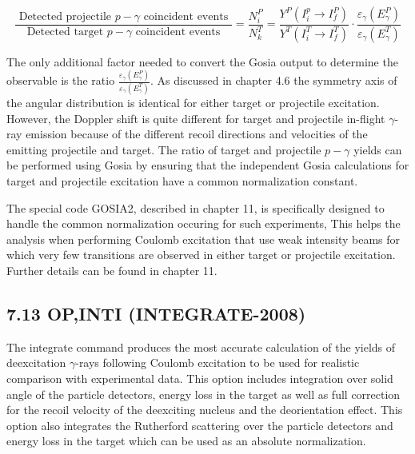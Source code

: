 \documentclass[10pt]{article}
\begin{document}
\begin{equation*}
\frac{\text { Detected projectile } p-\gamma \text { coincident events }}{\text { Detected target } p-\gamma \text { coincident events }}=\frac{N_{i}^{P}}{N_{k}^{T}}=\frac{Y^{P}\left(I_{i}^{p} \rightarrow I_{f}^{P}\right)}{Y^{T}\left(I_{i}^{T} \rightarrow I_{f}^{T}\right)} \cdot \frac{\varepsilon_{\gamma}\left(E_{\gamma}^{P}\right)}{\varepsilon_{\gamma}\left(E_{\gamma}^{T}\right)} \tag{7.2}
\end{equation*}


The only additional factor needed to convert the Gosia output to determine the observable is the ratio $\frac{\varepsilon_{\gamma}\left(E_{\gamma}^{P}\right)}{\varepsilon_{\gamma}\left(E_{\gamma}^{T}\right)}$. As discussed in chapter 4.6 the symmetry axis of the angular distribution is identical for either target or projectile excitation. However, the Doppler shift is quite different for target and projectile in-flight $\gamma$-ray emission because of the different recoil directions and velocities of the emitting projectile and target. The ratio of target and projectile $p-\gamma$ yields can be performed using Gosia by ensuring that the independent Gosia calculations for target and projectile excitation have a common normalization constant.

The special code GOSIA2, described in chapter 11, is specifically designed to handle the common normalization occuring for such experiments, This helps the analysis when performing Coulomb excitation that use weak intensity beams for which very few transitions are observed in either target or projectile excitation. Further details can be found in chapter 11.

\subsection*{7.13 OP,INTI (INTEGRATE-2008)}
The integrate command produces the most accurate calculation of the yields of deexcitation $\gamma$-rays following Coulomb excitation to be used for realistic comparison with experimental data. This option includes integration over solid angle of the particle detectors, energy loss in the target as well as full correction for the recoil velocity of the deexciting nucleus and the deorientation effect. This option also integrates the Rutherford scattering over the particle detectors and energy loss in the target which can be used as an absolute normalization.
\end{document}
